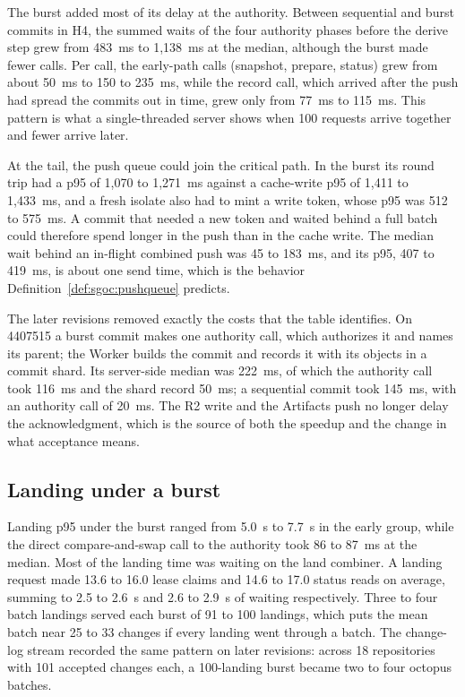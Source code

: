 \documentclass[11pt,letterpaper]{article}
\theoremstyle{definition}
\theoremstyle{remark}
\begin{document}
The burst added most of its delay at the authority. Between sequential and burst commits in H4, the summed waits of the four authority phases before the derive step grew from 483~ms to 1,138~ms at the median, although the burst made fewer calls. %
Per call, the early-path calls (snapshot, prepare, status) grew from about 50~ms to 150 to 235~ms, while the record call, which arrived after the push had spread the commits out in time, grew only from 77~ms to 115~ms. %
This pattern is what a single-threaded server shows when 100 requests arrive together and fewer arrive later.

At the tail, the push queue could join the critical path. In the burst its round trip had a p95 of 1,070 to 1,271~ms against a cache-write p95 of 1,411 to 1,433~ms, and a fresh isolate also had to mint a write token, whose p95 was 512 to 575~ms. A commit that needed a new token and waited behind a full batch could therefore spend longer in the push than in the cache write. %
The median wait behind an in-flight combined push was 45 to 183~ms, and its p95, 407 to 419~ms, is about one send time, which is the behavior Definition~\ref{def:sgoc:pushqueue} predicts. %

The later revisions removed exactly the costs that the table identifies. On 4407515 a burst commit makes one authority call, which authorizes it and names its parent; the Worker builds the commit and records it with its objects in a commit shard. %
Its server-side median was 222~ms, of which the authority call took 116~ms and the shard record 50~ms; a sequential commit took 145~ms, with an authority call of 20~ms. %
The R2 write and the Artifacts push no longer delay the acknowledgment, which is the source of both the speedup and the change in what acceptance means.

\subsection{Landing under a burst}

Landing p95 under the burst ranged from 5.0~s to 7.7~s in the early group, while the direct compare-and-swap call to the authority took 86 to 87~ms at the median. %
Most of the landing time was waiting on the land combiner. A landing request made 13.6 to 16.0 lease claims and 14.6 to 17.0 status reads on average, summing to 2.5 to 2.6~s and 2.6 to 2.9~s of waiting respectively. %
Three to four batch landings served each burst of 91 to 100 landings, which puts the mean batch near 25 to 33 changes if every landing went through a batch. %
The change-log stream recorded the same pattern on later revisions: across 18 repositories with 101 accepted changes each, a 100-landing burst became two to four octopus batches. %
\end{document}
